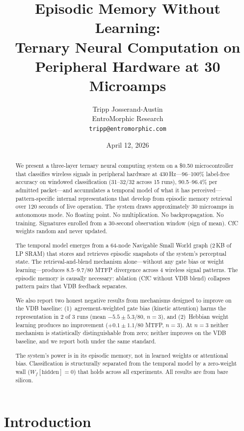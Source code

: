\documentclass[11pt,letterpaper]{article}
\title{Episodic Memory Without Learning:\\Ternary Neural Computation on Peripheral Hardware at 30 Microamps}
\author{Tripp Josserand-Austin\\EntroMorphic Research\\\texttt{tripp@entromorphic.com}}
\date{April 12, 2026}
\begin{document}
\maketitle

\begin{abstract}
We present a three-layer ternary neural computing system on a \$0.50 microcontroller that classifies wireless signals in peripheral hardware at 430\,Hz---96--100\% label-free accuracy on windowed classification (31--32/32 across 15 runs), 90.5--96.4\% per admitted packet---and accumulates a temporal model of what it has perceived---pattern-specific internal representations that develop from episodic memory retrieval over 120 seconds of live operation. The system draws approximately 30 microamps in autonomous mode. No floating point. No multiplication. No backpropagation. No training. Signatures enrolled from a 30-second observation window (sign of mean). CfC weights random and never updated.

The temporal model emerges from a 64-node Navigable Small World graph (2\,KB of LP SRAM) that stores and retrieves episodic snapshots of the system's perceptual state. The retrieval-and-blend mechanism alone---without any gate bias or weight learning---produces 8.5--9.7/80 MTFP divergence across 4 wireless signal patterns. The episodic memory is causally necessary: ablation (CfC without VDB blend) collapses pattern pairs that VDB feedback separates.

We also report two honest negative results from mechanisms designed to improve on the VDB baseline: (1)~agreement-weighted gate bias (kinetic attention) harms the representation in 2 of 3 runs (mean $-5.5 \pm 5.3$/80, $n=3$), and (2)~Hebbian weight learning produces no improvement ($+0.1 \pm 1.1$/80 MTFP, $n=3$). At $n=3$ neither mechanism is statistically distinguishable from zero; neither improves on the VDB baseline, and we report both under the same standard.

The system's power is in its episodic memory, not in learned weights or attentional bias. Classification is structurally separated from the temporal model by a zero-weight wall ($W_f[\text{hidden}] = 0$) that holds across all experiments. All results are from bare silicon.
\end{abstract}

\section{Introduction}
\end{document}
